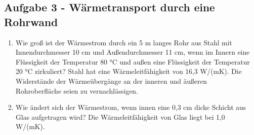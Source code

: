 \documentclass[a4paper,11pt]{article}
\newif\ifshowme
\begin{document}
\subsection*{Aufgabe 3 - Wärmetransport durch eine Rohrwand}

\begin{enumerate}[label=\alph*),itemsep=-3mm]

\item 
Wie groß ist der Wärmestrom durch ein 5 m langes Rohr aus Stahl mit
Innendurchmesser 10 cm und Außendurchmesser 11 cm, wenn im Innern eine
Flüssigkeit der Temperatur 80 °C und außen eine Flüssigkeit der Temperatur
20 °C zirkuliert? Stahl hat eine Wärmeleitfähigkeit von 16,3 W/(mK). Die
Widerstände der Wärmeübergänge an der inneren und äußeren Rohroberfläche
seien zu vernachlässigen.

\ifshowme
\antwort{
\begin{align*}
\dot{Q} &= (T_i - T_a) \frac{2 \pi l \cdot \lambda}{\ln(\frac{r_i}{r_a})} \\
\dot{Q} &= 60~ \text{°C} \cdot \frac{2 \pi \cdot 5~\text{m} \cdot 16,3~ \text{W/m°C} }{\ln(\frac{55}{50})} \\
	&= 322.366,15~ \text{W}
\end{align*}
}
\else
\fi



\begin{marginfigure}[-3cm]
\caption{Stahlrohr mit innerer Glasschicht.}
\end{marginfigure}

\item Wie ändert sich der Wärmestrom, wenn innen eine 0,3 cm dicke Schicht aus
Glas aufgetragen wird? Die Wärmeleitfähigkeit von Glas liegt bei 1,0 W/(mK).
\end{enumerate}

\ifshowme
\antwort{
\begin{align*}
\dot{Q} &= 2 \pi \cdot l \cdot (T_i - T_a) \cdot \left( \frac{\ln(\frac{r_{SA}}{r_{SI}})}{\lambda_1} + \frac{\ln(\frac{r_{GA}}{r_{GI}})}{\lambda_2} \right)^{-1} \\
\dot{Q} &= 2 \pi \cdot 5m \cdot 60~ \text{°C} \cdot \left( {\frac{\ln(\frac{0,055}{0,05})}{16,3~ \text{W/m°C}} + \frac{\ln(\frac{0,05}{0,047})}{1~ \text{W/m°C}}} \right)^{-1} \\
	&= 27.833,46~ \text{W}
\end{align*}
}
\else
\fi
\end{document}
